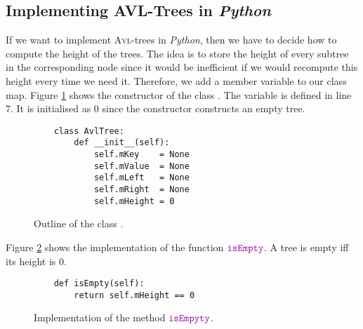 \subsection{Implementing AVL-Trees in \textsl{Python}}
If we want to implement \textsc{Avl}-trees in \textsl{Python}, then we have to decide how to compute the height
of the trees.  The idea is to store the height of every subtree in the corresponding node since it
would be inefficient if we would recompute this height every time we need it.  Therefore, we add a
member variable  to our class map.
Figure \ref{fig:avl-tree.ipython:init} shows the constructor of the class .  The variable
 is defined in line 7.  It is initialised as $0$ since the constructor 
constructs an empty tree.  

\begin{figure}[!ht]
  \centering
\begin{verbatim}
    class AvlTree:
        def __init__(self):
            self.mKey    = None
            self.mValue  = None
            self.mLeft   = None
            self.mRight  = None
            self.mHeight = 0 
\end{verbatim}
\vspace*{-0.3cm}
  \caption{Outline of the class .}
  \label{fig:avl-tree.ipython:init}
\end{figure}

Figure \ref{fig:avl-tree.ipython:isEmpty} shows the implementation of the function $\mytt{isEmpty}$.
A tree is empty iff its height is $0$.

\begin{figure}[!ht]
\centering
\begin{verbatim}
    def isEmpty(self):
        return self.mHeight == 0
\end{verbatim}
\vspace*{-0.3cm}
\caption{Implementation of the method $\mytt{isEmpyty}$.}
\label{fig:avl-tree.ipython:isEmpty}
\end{figure}

